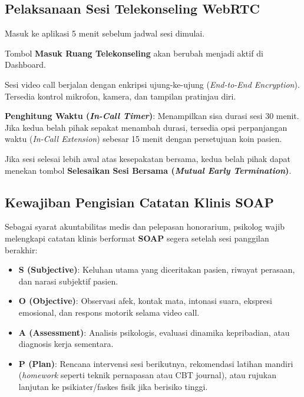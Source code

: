 \subsection{Pelaksanaan Sesi Telekonseling WebRTC}
\begin{steplist}
  \item Masuk ke aplikasi 5 menit sebelum jadwal sesi dimulai.
  \item Tombol \textbf{Masuk Ruang Telekonseling} akan berubah menjadi aktif di Dashboard.
  \item Sesi video call berjalan dengan enkripsi ujung-ke-ujung (\textit{End-to-End Encryption}). Tersedia kontrol mikrofon, kamera, dan tampilan pratinjau diri.
  \item \textbf{Penghitung Waktu (\textit{In-Call Timer})}: Menampilkan sisa durasi sesi 30 menit. Jika kedua belah pihak sepakat menambah durasi, tersedia opsi perpanjangan waktu (\textit{In-Call Extension}) sebesar 15 menit dengan persetujuan koin pasien.
  \item Jika sesi selesai lebih awal atas kesepakatan bersama, kedua belah pihak dapat menekan tombol \textbf{Selesaikan Sesi Bersama (\textit{Mutual Early Termination})}.
\end{steplist}


\subsection{Kewajiban Pengisian Catatan Klinis SOAP}
Sebagai syarat akuntabilitas medis dan pelepasan honorarium, psikolog wajib melengkapi catatan klinis berformat \textbf{SOAP} segera setelah sesi panggilan berakhir:
\begin{itemize}[leftmargin=1.4em]
  \item \textbf{S (Subjective)}: Keluhan utama yang diceritakan pasien, riwayat perasaan, dan narasi subjektif pasien.
  \item \textbf{O (Objective)}: Observasi afek, kontak mata, intonasi suara, ekspresi emosional, dan respons motorik selama video call.
  \item \textbf{A (Assessment)}: Analisis psikologis, evaluasi dinamika kepribadian, atau diagnosis kerja sementara.
  \item \textbf{P (Plan)}: Rencana intervensi sesi berikutnya, rekomendasi latihan mandiri (\textit{homework} seperti teknik pernapasan atau CBT journal), atau rujukan lanjutan ke psikiater/faskes fisik jika berisiko tinggi.
\end{itemize}

